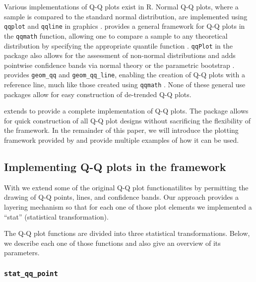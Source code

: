 Various implementations of Q-Q plots exist in R. Normal Q-Q plots, where
a sample is compared to the standard normal distribution, are
implemented using \texttt{qqplot} and \texttt{qqline} in 
graphics \citep{R}.  provides a general framework for Q-Q
plots in the \texttt{qqmath} function, allowing one to compare a sample
to any theoretical distribution by specifying the appropriate quantile
function \citep{lattice}. \texttt{qqPlot} in the  package also
allows for the assessment of non-normal distributions and adds pointwise
confidence bands via normal theory or the parametric bootstrap
\citep{car}.  provides \texttt{geom\_qq} and
\texttt{geom\_qq\_line}, enabling the creation of Q-Q plots with a
reference line, much like those created using \texttt{qqmath}
\citep{ggplot2}. None of these general use packages allow for easy
construction of de-trended Q-Q plots.

 extends  to provide a complete implementation
of Q-Q plots. The package allows for quick construction of all Q-Q plot
designs without sacrificing the flexibility of the 
framework. In the remainder of this paper, we will introduce the
plotting framework provided by  and provide multiple
examples of how it can be used.

\subsection{\texorpdfstring{Implementing Q-Q plots in the 
framework}{Implementing Q-Q plots in the  framework}}\label{implementing-q-q-plots-in-the-framework}

\label{sec:implementing}

With  we extend some of the original  Q-Q plot
functionatilites by permitting the drawing of Q-Q points, lines, and
confidence bands. Our approach provides a  layering
mechanism so that for each one of those plot elements we implemented a
 ``stat'' (statistical transformation).

The Q-Q plot functions are divided into three statistical
transformations. Below, we describe each one of those functions and also
give an overview of its parameters.

\subsubsection{\texorpdfstring{\texttt{stat\_qq\_point}}{stat\_qq\_point}}\label{stat_qq_point}

